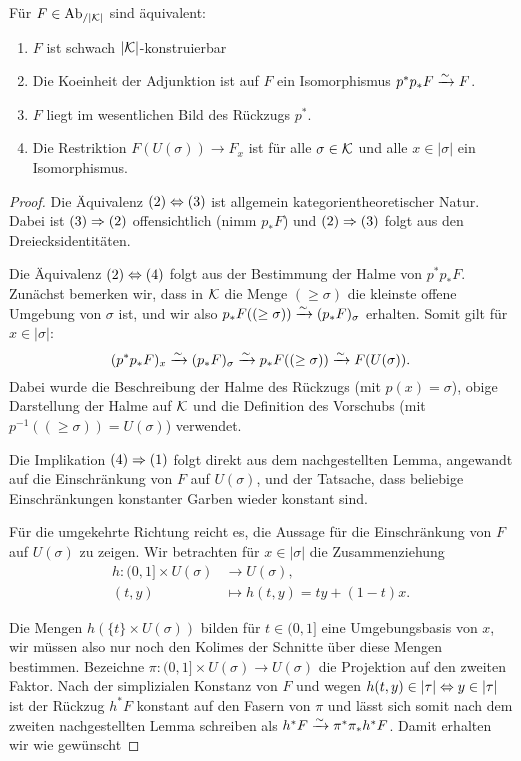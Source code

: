 \begin{prop}[\cite{WS}]
  Für $F \in \operatorname{Ab}_{/|\mathcal{K}|}$ sind äquivalent:
  \begin{enumerate}
  \item $F$ ist schwach $|\mathcal{K}|$-konstruierbar
  \item Die Koeinheit der Adjunktion ist auf $F$ ein Isomorphismus
    $p^*p_*F \xrightarrow{\sim} F$.
  \item $F$ liegt im wesentlichen Bild des Rückzugs $p^*$.
  \item Die Restriktion $F(U(\sigma)) \to F_x$ ist für alle $\sigma
    \in \mathcal{K}$ und alle $x \in |\sigma|$ ein Isomorphismus.
  \end{enumerate}
\end{prop}
\begin{proof}
  Die Äquivalenz $(2) \Leftrightarrow (3)$ ist allgemein kategorientheoretischer
  Natur. Dabei ist $(3) \Rightarrow (2)$ offensichtlich (nimm $p_* F$)
  und $(2) \Rightarrow (3)$ folgt aus den Dreiecksidentitäten.

  Die Äquivalenz $(2) \Leftrightarrow (4)$ folgt aus der Bestimmung der Halme von
  $p^*p_* F$. Zunächst bemerken wir, dass in $\mathcal{K}$ die Menge $(\geq
  \sigma)$ die kleinste offene Umgebung von $\sigma$ ist, und wir also
  $p_*F((\geq \sigma)) \xrightarrow{\sim} (p_*F)_{\sigma}$ erhalten. Somit gilt für
  $x \in |\sigma|$:
  \[ (p^*p_*F)_x \xrightarrow{\sim} (p_*F)_{\sigma} \xrightarrow{\sim} p_*F((\geq \sigma)) \xrightarrow{\sim} F(U(\sigma)). \]
  Dabei wurde die Beschreibung der Halme des Rückzugs (mit $p(x) =
  \sigma$), obige Darstellung der Halme auf $\mathcal{K}$ und die Definition
  des Vorschubs (mit $p^{-1}((\geq \sigma)) = U(\sigma)$) verwendet.

  Die Implikation $(4) \Rightarrow (1)$ folgt direkt aus dem
  nachgestellten Lemma, angewandt auf die Einschränkung von $F$ auf
  $U(\sigma)$, und der Tatsache, dass beliebige Einschränkungen
  konstanter Garben wieder konstant sind.

  Für die umgekehrte Richtung reicht es, die Aussage für die
  Einschränkung von $F$ auf $U(\sigma)$ zu zeigen. Wir betrachten für
  $x \in |\sigma|$ die Zusammenziehung
  \begin{align*}
    h: (0, 1] \times U(\sigma) &\to U(\sigma), \\
    (t, y) &\mapsto h(t, y) = t y + (1 - t) x.
  \end{align*}
  
  Die Mengen $h(\{t\} \times U(\sigma))$ bilden für $t \in (0, 1]$
    eine Umgebungsbasis von $x$, wir müssen also nur noch den Kolimes
    der Schnitte über diese Mengen bestimmen. Bezeichne $\pi: (0, 1]
      \times U(\sigma) \to U(\sigma)$ die Projektion auf den zweiten
      Faktor. Nach der simplizialen Konstanz von $F$ und wegen $h(t,
      y) \in |\tau| \Leftrightarrow y \in |\tau|$ ist der Rückzug $h^* F$
      konstant auf den Fasern von $\pi$ und lässt sich somit nach dem
      zweiten nachgestellten Lemma schreiben als $h^* F \xrightarrow{\sim} \pi^*
      \pi_* h^* F$. Damit erhalten wir wie gewünscht
      

\end{proof}
